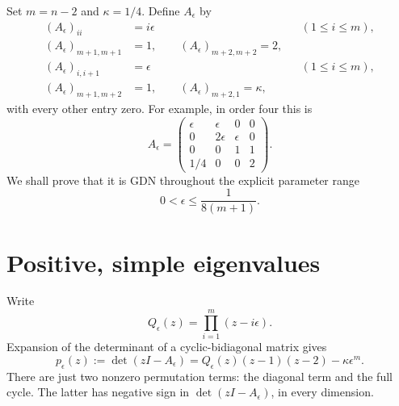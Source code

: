 \documentclass[11pt]{article}
\begin{document}
Set $m=n-2$ and $\kappa=1/4$. Define $A_\epsilon$ by
\begin{align}
(A_\epsilon)_{ii}&=i\epsilon &&(1\le i\le m),\nonumber\\
(A_\epsilon)_{m+1,m+1}&=1,\qquad (A_\epsilon)_{m+2,m+2}=2,\nonumber\\
(A_\epsilon)_{i,i+1}&=\epsilon &&(1\le i\le m),\label{eq:matrix}\\
(A_\epsilon)_{m+1,m+2}&=1,\qquad (A_\epsilon)_{m+2,1}=\kappa,\nonumber
\end{align}
with every other entry zero. For example, in order four this is
\[
A_\epsilon=\begin{pmatrix}
\epsilon&\epsilon&0&0\\
0&2\epsilon&\epsilon&0\\
0&0&1&1\\
1/4&0&0&2
\end{pmatrix}.
\]
We shall prove that it is GDN throughout the explicit parameter range
\begin{equation}\label{eq:epsrange}
0<\epsilon\le\frac{1}{8(m+1)}.
\end{equation}

\section{Positive, simple eigenvalues}
Write
\[
Q_\epsilon(z)=\prod_{i=1}^m(z-i\epsilon).
\]
Expansion of the determinant of a cyclic-bidiagonal matrix gives
\begin{equation}\label{eq:char}
p_\epsilon(z):=\det(zI-A_\epsilon)
=Q_\epsilon(z)(z-1)(z-2)-\kappa\epsilon^m.
\end{equation}
There are just two nonzero permutation terms: the diagonal term and the full cycle. The latter has negative sign in $\det(zI-A_\epsilon)$, in every dimension.
\end{document}

